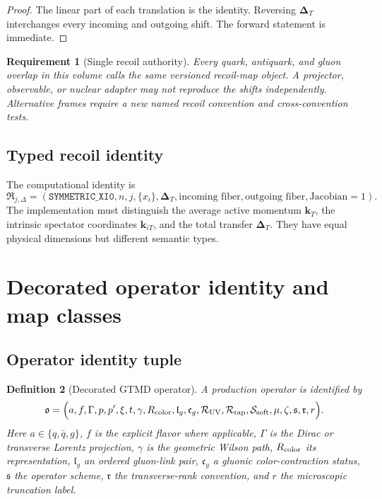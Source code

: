 \documentclass[11pt]{article}
\newtheorem{definition}{Definition}[section]
\newtheorem{requirement}[definition]{Requirement}
\newcommand{\kT}{\bm{k}_{T}}
\newcommand{\kiT}{\bm{k}_{iT}}
\newcommand{\DT}{\bm{\Delta}_{T}}
\newcommand{\cR}{\mathcal R}
\newcommand{\cS}{\mathcal S}
\begin{document}
\begin{proof}
The linear part of each translation is the identity.  Reversing \(\DT\)
interchanges every incoming and outgoing shift.  The forward statement is
immediate.
\end{proof}

\begin{requirement}[Single recoil authority]
\label{req:single-recoil-authority}
Every quark, antiquark, and gluon overlap in this volume calls the same
versioned recoil-map object.  A projector, observable, or nuclear adapter may
not reproduce the shifts independently.  Alternative frames require a new
named recoil convention and cross-convention tests.
\end{requirement}

\subsection{Typed recoil identity}

The computational identity is
\begin{equation}
 \mathfrak R_{j,\Delta}=
 \left(
 \texttt{SYMMETRIC\_XI0},
 n,j,\{x_i\},\DT,
 \text{incoming fiber},
 \text{outgoing fiber},
 \text{Jacobian}=1
 \right).
\label{eq:typed-recoil-id}
\end{equation}
The implementation must distinguish the average active momentum \(\kT\),
the intrinsic spectator coordinates \(\kiT\), and the total transfer \(\DT\).
They have equal physical dimensions but different semantic types.

\section{Decorated operator identity and map classes}
\label{sec:operator-identity}

\subsection{Operator identity tuple}

\begin{definition}[Decorated GTMD operator]
\label{def:decorated-operator}
A production operator is identified by
\begin{equation}
 \mathfrak o=
 \Bigl(
 a,f,\Gamma,
 p,p',\xi,t,
 \gamma, R_{\rm color},
 \mathfrak l_g,\mathfrak c_g,
 \cR_{\rm UV},\cR_{\rm rap},
 \cS_{\rm soft},\mu,\zeta,
 \mathfrak s,\mathfrak r,
 r
 \Bigr).
\label{eq:decorated-op-tuple}
\end{equation}
Here \(a\in\{q,\bar q,g\}\), \(f\) is the explicit flavor where
applicable, \(\Gamma\) is the Dirac or transverse Lorentz projection,
\(\gamma\) is the geometric Wilson path, \(R_{\rm color}\) its
representation, \(\mathfrak l_g\) an ordered gluon-link pair,
\(\mathfrak c_g\) a gluonic color-contraction status, \(\mathfrak s\) the
operator scheme, \(\mathfrak r\) the transverse-rank convention, and \(r\)
the microscopic truncation label.
\end{definition}
\end{document}
